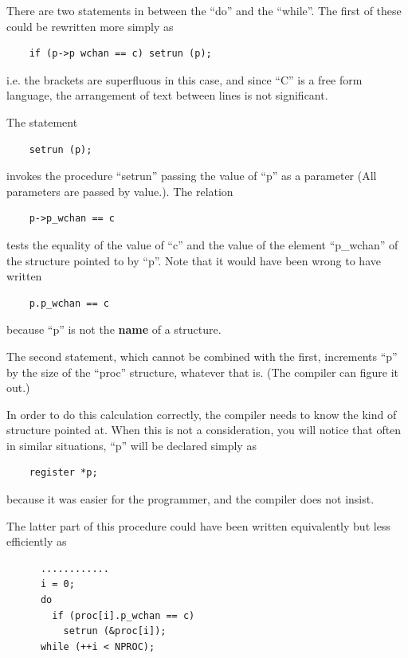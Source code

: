 There are two statements in between the
``do'' and the ``while''.
The first of these could be rewritten
more simply as

\begin{verbatim}
    if (p->p wchan == c) setrun (p);
\end{verbatim}

\noindent i.e. the brackets are superfluous in
this case, and since ``C'' is a free form
language, the arrangement of text
between lines is not significant.


\noindent The statement

\begin{verbatim}
    setrun (p);
\end{verbatim}


\noindent invokes the procedure ``setrun'' passing
the value of ``p'' as a parameter (All
parameters are passed by value.). The relation

\begin{verbatim}
    p->p_wchan == c
\end{verbatim}


\noindent tests the equality of the value of ``c''
and the value of the element ``p\_wchan''
of the structure pointed to by ``p''.
Note that it would have been wrong to
have written

\begin{verbatim}
    p.p_wchan == c
\end{verbatim}

\noindent because ``p'' is not the {\bf name} of a structure.

The second statement, which cannot be
combined with the first, increments ``p''
by the size of the ``proc'' structure,
whatever that is. (The compiler can
figure it out.)

In order to do this calculation
correctly, the compiler needs to know
the kind of structure pointed at. When
this is not a consideration, you will
notice that often in similar situations, ``p'' will be declared simply as

\begin{verbatim}
    register *p;
\end{verbatim}

\noindent because it was easier for the
programmer, and the compiler does not insist.

The latter part of this procedure could
have been written equivalently but less
efficiently as

\begin{verbatim}
      ............
      i = 0;
      do
        if (proc[i].p_wchan == c)
          setrun (&proc[i]);
      while (++i < NPROC);
\end{verbatim}

